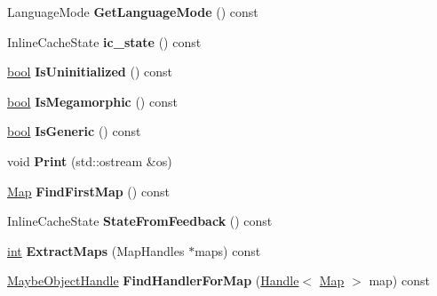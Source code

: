 \begin{DoxyCompactItemize}
Language\+Mode {\bfseries Get\+Language\+Mode} () const
\item 
\mbox{\label{classv8_1_1internal_1_1FeedbackNexus_aef36f0ea22f01d7ef7e56e33966e9321}} 
Inline\+Cache\+State {\bfseries ic\+\_\+state} () const
\item 
\mbox{\label{classv8_1_1internal_1_1FeedbackNexus_a42ae369a4977d9e39bc131005d9b837a}} 
\mbox{\hyperlink{classbool}{bool}} {\bfseries Is\+Uninitialized} () const
\item 
\mbox{\label{classv8_1_1internal_1_1FeedbackNexus_a3b92b8df5bc56872eedee13f505daa46}} 
\mbox{\hyperlink{classbool}{bool}} {\bfseries Is\+Megamorphic} () const
\item 
\mbox{\label{classv8_1_1internal_1_1FeedbackNexus_ad660a83cea14be0a72ce0a040cf73d76}} 
\mbox{\hyperlink{classbool}{bool}} {\bfseries Is\+Generic} () const
\item 
\mbox{\label{classv8_1_1internal_1_1FeedbackNexus_a728bb8853e48720608d866c7d1beef75}} 
void {\bfseries Print} (std\+::ostream \&os)
\item 
\mbox{\label{classv8_1_1internal_1_1FeedbackNexus_a42b0037afcbe7db6df8e9752b4ca30a8}} 
\mbox{\hyperlink{classv8_1_1internal_1_1Map}{Map}} {\bfseries Find\+First\+Map} () const
\item 
\mbox{\label{classv8_1_1internal_1_1FeedbackNexus_ae663a7bb3bc47a1bdd804897a9020d27}} 
Inline\+Cache\+State {\bfseries State\+From\+Feedback} () const
\item 
\mbox{\label{classv8_1_1internal_1_1FeedbackNexus_ad731696ecd901648ddd233d339201c76}} 
\mbox{\hyperlink{classint}{int}} {\bfseries Extract\+Maps} (Map\+Handles $\ast$maps) const
\item 
\mbox{\label{classv8_1_1internal_1_1FeedbackNexus_ad5ee29b73536bb5b4fb6d280a65a7738}} 
\mbox{\hyperlink{classv8_1_1internal_1_1MaybeObjectHandle}{Maybe\+Object\+Handle}} {\bfseries Find\+Handler\+For\+Map} (\mbox{\hyperlink{classv8_1_1internal_1_1Handle}{Handle}}$<$ \mbox{\hyperlink{classv8_1_1internal_1_1Map}{Map}} $>$ map) const

\end{DoxyCompactItemize}
